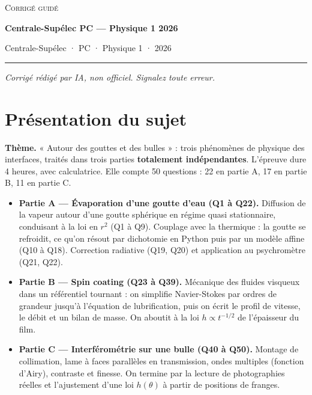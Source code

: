 \documentclass[11pt,a4paper]{article}
\providecommand{\tightlist}{\setlength{\itemsep}{0pt}\setlength{\parskip}{0pt}}
\begin{document}
\thispagestyle{plain}
\begin{center}
  {\small\scshape Corrigé guidé}\par\smallskip
  {\LARGE\bfseries Centrale-Supélec PC — Physique 1 2026\par}\medskip
  {\large Centrale-Supélec · PC · Physique 1 · 2026\par}
\end{center}
\vspace{2pt}\hrule\vspace{8pt}

\emph{Corrigé rédigé par IA, non officiel. Signalez toute erreur.}

\hypertarget{pruxe9sentation-du-sujet}{%
\section{Présentation du sujet}\label{pruxe9sentation-du-sujet}}

\textbf{Thème.} « Autour des gouttes et des bulles » : trois phénomènes de physique des interfaces, traités dans trois parties \textbf{totalement indépendantes}. L'épreuve dure 4 heures, avec calculatrice. Elle compte 50 questions : 22 en partie A, 17 en partie B, 11 en partie C.

\begin{itemize}
\tightlist
\item
  \textbf{Partie A --- Évaporation d'une goutte d'eau (Q1 à Q22).} Diffusion de la vapeur autour d'une goutte sphérique en régime quasi stationnaire, conduisant à la loi en \(r^2\) (Q1 à Q9). Couplage avec la thermique : la goutte se refroidit, ce qu'on résout par dichotomie en Python puis par un modèle affine (Q10 à Q18). Correction radiative (Q19, Q20) et application au psychromètre (Q21, Q22).
\item
  \textbf{Partie B --- Spin coating (Q23 à Q39).} Mécanique des fluides visqueux dans un référentiel tournant : on simplifie Navier-Stokes par ordres de grandeur jusqu'à l'équation de lubrification, puis on écrit le profil de vitesse, le débit et un bilan de masse. On aboutit à la loi \(h\propto t^{-1/2}\) de l'épaisseur du film.
\item
  \textbf{Partie C --- Interférométrie sur une bulle (Q40 à Q50).} Montage de collimation, lame à faces parallèles en transmission, ondes multiples (fonction d'Airy), contraste et finesse. On termine par la lecture de photographies réelles et l'ajustement d'une loi \(h(\theta)\) à partir de positions de franges.
\end{itemize}
\end{document}
